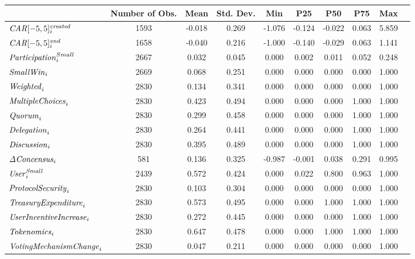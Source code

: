 \begin{tabular}{l*{9}{c}}\toprule
                &Number of Obs.&     Mean&Std. Dev.&      Min&      P25&      P50&      P75&      Max\\
\hline
${\it CAR}[-5,5]_{i}^{\it created}$&     1593&   -0.018&    0.269&   -1.076&   -0.124&   -0.022&    0.063&    5.859\\
${\it CAR}[-5,5]_{i}^{\it end}$&     1658&   -0.040&    0.216&   -1.000&   -0.140&   -0.029&    0.063&    1.141\\
${\it Participation}^{Small}_{i}$&     2667&    0.032&    0.045&    0.000&    0.002&    0.011&    0.052&    0.248\\
${\it Small Win}_{i}$&     2669&    0.068&    0.251&    0.000&    0.000&    0.000&    0.000&    1.000\\
${\it Weighted}_{i}$&     2830&    0.134&    0.341&    0.000&    0.000&    0.000&    0.000&    1.000\\
${\it Multiple Choices}_{i}$&     2830&    0.423&    0.494&    0.000&    0.000&    0.000&    1.000&    1.000\\
${\it Quorum}_{i}$&     2830&    0.299&    0.458&    0.000&    0.000&    0.000&    1.000&    1.000\\
${\it Delegation}_{i}$&     2830&    0.264&    0.441&    0.000&    0.000&    0.000&    1.000&    1.000\\
${\it Discussion}_{i}$&     2830&    0.395&    0.489&    0.000&    0.000&    0.000&    1.000&    1.000\\
${\it \Delta Concensus}_{i}$&      581&    0.136&    0.325&   -0.987&   -0.001&    0.038&    0.291&    0.995\\
${\it User}_{i}^{\it Small}$&     2439&    0.572&    0.424&    0.000&    0.022&    0.800&    0.963&    1.000\\
${\it Protocol Security}_{i}$&     2830&    0.103&    0.304&    0.000&    0.000&    0.000&    0.000&    1.000\\
${\it Treasury Expenditure}_{i}$&     2830&    0.573&    0.495&    0.000&    0.000&    1.000&    1.000&    1.000\\
${\it User Incentive Increase}_{i}$&     2830&    0.272&    0.445&    0.000&    0.000&    0.000&    1.000&    1.000\\
${\it Tokenomics}_{i}$&     2830&    0.647&    0.478&    0.000&    0.000&    1.000&    1.000&    1.000\\
${\it Voting Mechanism Change}_{i}$&     2830&    0.047&    0.211&    0.000&    0.000&    0.000&    0.000&    1.000\\
\bottomrule\end{tabular}
